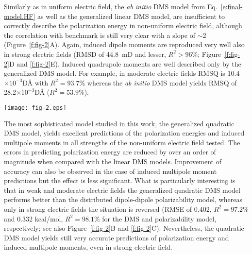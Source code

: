 \documentclass[aip,jcp,preprint,amsmath,amssymb,floatfix]{revtex4-1}
\begin{document}
Similarly as in uniform electric field, 
the \emph{ab initio} DMS model from Eq.~\eqref{e:final-model.HF} 
as well as the generalized linear DMS model, are insufficient to correctly describe the polarization energy 
in non\hyp{}uniform electric field, although the correlation with benchmark is still very clear with a slope of $\sim$2
(Figure~\ref{f:fig-2}A). Again, induced dipole moments are reproduced very well also
in strong electric fields (RMSD of 44.8~mD and lesser, $R^2>96\%$; Figure~\ref{f:fig-2}D and \ref{f:fig-2}E).
Induced quadrupole moments are well described only by the generalized DMS model.
For example, in moderate electric fields RMSQ is 10.4$\times 10^{-3}$D\AA{ }with $R^2=93.7\%$
whereas the \emph{ab initio} DMS model yields RMSQ of 28.2$\times 10^{-3}$D\AA{ }($R^2=53.9\%$).

\begin{figure*}[h]
\texttt{[image: fig-2.eps]}
\caption{\label{f:fig-2} {\bf Performance of the distributed DMS tensors of ground\hyp{}state water molecule in strong
non\hyp{}uniform electric field.}
In this Figure, `Ab Initio DMS' (panels A, D and G) 
refers to the model from Eq.~\eqref{e:final-model.HF} and
`Generalized DMS' (panels B, E and H) 
refers to the generalized model with $R_{\rm max}=2$ 
where $R_{\rm max}$ is the maximum power
in the expansion from Eq.~\eqref{e:final-model.General}.
Comparison with the distributed dipole\hyp{}dipole polarizability model %
is also shown in this Figure in panels C, F and I. 
The ensemble of electric fields corresponds to the `S' set
from Tables~\ref{t:results} and \ref{t:fields}.}
\end{figure*}

The most sophisticated model studied in this work, the generalized quadratic DMS model, yields excellent predictions 
of the polarization energies and induced multipole moments in all strengths of the non\hyp{}uniform electric field tested.
The errors in predicting polarization energy are reduced by over an order of magnitude when compared with
the linear DMS models. Improvement of accuracy can also be observed in the case of induced multipole moment predictions
but the effect is less significant.
What is particularly interesting is that in weak and moderate electric fields
the generalized quadratic DMS model performs better than the distributed dipole\hyp{}dipole
polarizability model, whereas only in strong electric fields the situation is reversed
(RMSE of 0.402, $R^2=97.2\%$ and 0.332 kcal/mol, $R^2=98.1\%$ for the DMS and polarizability model, respectively; 
see also Figure~\ref{f:fig-2}B and \ref{f:fig-2}C).
Nevertheless, the quadratic DMS model yields still very accurate predictions 
of polarization energy and induced multipole moments, even in strong electric field.
\end{document}
